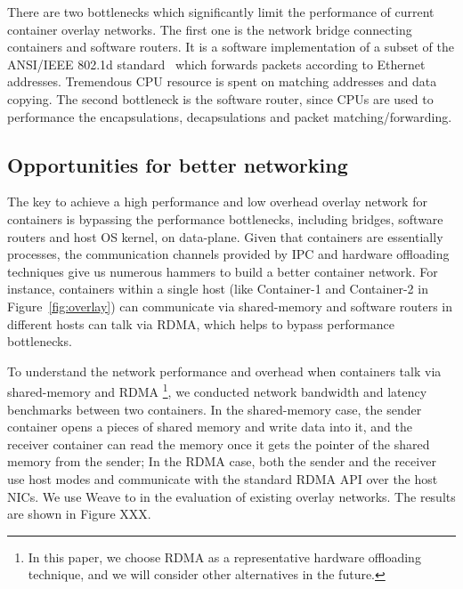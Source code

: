 There are two bottlenecks which significantly limit the performance
of current container overlay networks. The first one is the network bridge
connecting containers and software routers. It is a software implementation
of a subset of the ANSI/IEEE 802.1d standard~\cite{?} which forwards packets
according to Ethernet addresses. Tremendous CPU resource is spent on matching
addresses and data copying. The second bottleneck is the software router, since
CPUs are used to performance the encapsulations, decapsulations and packet matching/forwarding.


\subsection{Opportunities for better networking}



The key to achieve a high performance and low overhead overlay network
for containers is bypassing the performance bottlenecks, including
bridges, software routers and host OS kernel, on data-plane. Given that
containers are essentially processes, the communication channels provided
by IPC and hardware offloading techniques give us numerous hammers to 
build a better container network. For instance, 
containers within a single host (like Container-1 and 
Container-2 in Figure~\ref{fig:overlay}) can communicate via 
shared-memory and software routers in different hosts can talk via RDMA, 
which helps to bypass performance bottlenecks.

To understand the network performance and overhead when containers
talk via shared-memory and RDMA \footnote{In this paper, we choose RDMA
as a representative hardware offloading technique, and we will consider other
alternatives in the future.}, we conducted network bandwidth and latency benchmarks between two containers. In the shared-memory case, the sender
container opens a pieces of shared memory and write data into it, and 
the receiver container can read the memory once it gets the pointer of 
the shared memory from the sender; In the RDMA case, both the sender
and the receiver use host modes and communicate with the standard RDMA API
over the host NICs. We use Weave to in the evaluation of existing overlay
networks. The results are shown in Figure XXX.

